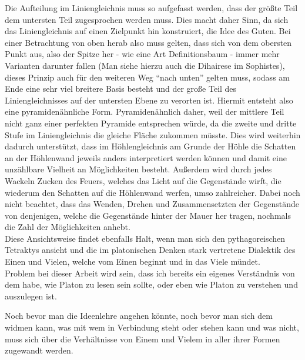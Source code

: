 \documentclass[12pt]{article}
\begin{document}
Die Aufteilung im Liniengleichnis muss so aufgefasst werden, dass der größte Teil dem untersten Teil zugesprochen werden muss. Dies macht daher Sinn, da sich das Liniengleichnis auf einen Zielpunkt hin konstruiert, die Idee des Guten. Bei einer Betrachtung von oben herab also muss gelten, dass sich von dem obersten Punkt aus, also der Spitze her - wie eine Art Definitionsbaum - immer mehr Varianten darunter fallen (Man siehe hierzu auch die Dihairese im Sophistes), dieses Prinzip auch für den weiteren Weg \enquote{nach unten} gelten muss, sodass am Ende eine sehr viel breitere Basis besteht und der große Teil des Liniengleichnisses auf der untersten Ebene zu verorten ist. Hiermit entsteht also eine pyramidenähnliche Form. Pyramidenähnlich daher, weil der mittlere Teil nicht ganz einer perfekten Pyramide entsprechen würde, da die zweite und dritte Stufe im Liniengleichnis die gleiche Fläche zukommen müsste. Dies wird weiterhin dadurch unterstützt, dass im Höhlengleichnis am Grunde der Höhle die Schatten an der Höhlenwand jeweils anders interpretiert werden können und damit eine unzählbare Vielheit an Möglichkeiten besteht. Außerdem wird durch jedes Wackeln Zucken des Feuers, welches das Licht auf die Gegenstände wirft, die wiederum den Schatten auf die Höhlenwand werfen, umso zahlreicher. Dabei noch nicht beachtet, dass das Wenden, Drehen und Zusammensetzten der Gegenstände von denjenigen, welche die Gegenstände hinter der Mauer her tragen, nochmals die Zahl der Möglichkeiten anhebt.\\
Diese Ansichtsweise findet ebenfalls Halt, wenn man sich den pythagoreischen Tetraktys ansieht und die im platonischen Denken stark vertretene Dialektik des Einen und Vielen, welche vom Einen beginnt und in das Viele mündet.\\
Problem bei dieser Arbeit wird sein, dass ich bereits ein eigenes Verständnis von dem habe, wie Platon zu lesen sein sollte, oder eben wie Platon zu verstehen und auszulegen ist. 

Noch bevor man die Ideenlehre angehen könnte, noch bevor man sich dem widmen kann, was mit wem in Verbindung steht oder stehen kann und was nicht, muss sich über die Verhältnisse von Einem und Vielem in aller ihrer Formen zugewandt werden.
\end{document}
